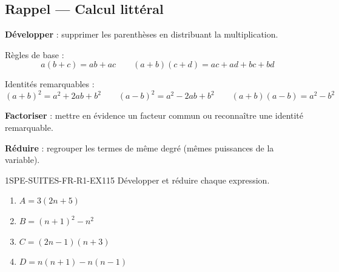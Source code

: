 

\subsection*{Rappel — Calcul littéral}

\textbf{Développer} : supprimer les parenthèses en distribuant la multiplication.

Règles de base :
\[
  a(b + c) = ab + ac \qquad (a+b)(c+d) = ac + ad + bc + bd
\]

Identités remarquables :
\[
  (a+b)^2 = a^2 + 2ab + b^2 \qquad (a-b)^2 = a^2 - 2ab + b^2 \qquad (a+b)(a-b) = a^2 - b^2
\]

\textbf{Factoriser} : mettre en évidence un facteur commun ou reconnaître une identité remarquable.

\textbf{Réduire} : regrouper les termes de même degré (mêmes puissances de la variable).


\begin{exercice}{1SPE-SUITES-FR-R1-EX1}{1}{5}
Développer et réduire chaque expression.
\begin{enumerate}
  \item $A = 3(2n + 5)$
  \item $B = (n+1)^2 - n^2$
  \item $C = (2n-1)(n+3)$
  \item $D = n(n+1) - n(n-1)$
\end{enumerate}
\end{exercice}


